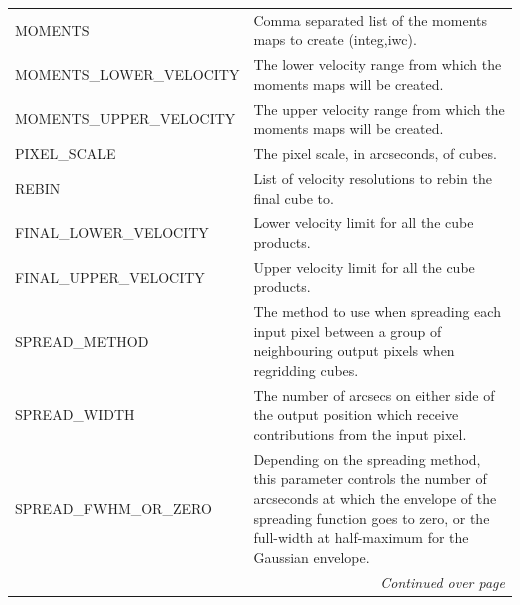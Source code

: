 \documentclass[11pt,oneside,chapters]{starlink}
\begin{document}
\begin{table}[h!]
\begin{small}
\begin{tabular}{|p{6.8cm}|p{8.6cm}|}
\hline
MOMENTS & Comma separated list of the moments maps to create (integ,iwc).\\

MOMENTS\_LOWER\_VELOCITY & The lower velocity range from which the moments maps will be
                           created.\\
MOMENTS\_UPPER\_VELOCITY & The upper velocity range from which the moments maps will be
                           created.\\
\hline
PIXEL\_SCALE & The pixel scale, in arcseconds, of cubes.\\
\hline
REBIN & List of velocity resolutions to rebin the final cube to.\\
\hline
FINAL\_LOWER\_VELOCITY & Lower velocity limit for all the cube products.\\

FINAL\_UPPER\_VELOCITY & Upper velocity limit for all the cube products.\\
\hline
SPREAD\_METHOD & The method to use when spreading each input pixel between a group of
                 neighbouring output pixels when regridding cubes.\\

SPREAD\_WIDTH & The number of arcsecs on either side of the output position which
                receive contributions from the input pixel.\\

SPREAD\_FWHM\_OR\_ZERO & Depending on the spreading method, this parameter controls the
                         number of arcseconds at which the envelope of the spreading
                         function goes to zero, or the full-width at half-maximum
                         for the Gaussian envelope. \\
\hline
 \multicolumn{2}{|r|}{\emph{Continued over page}}\\
\hline
\end{tabular}
\label{tab:params}
\end{small}
\end{table}
\end{document}
